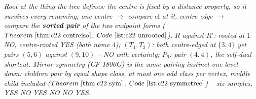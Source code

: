 \begin{recallbox}
\emph{Root at the thing the tree defines: the centre is fixed by a distance
property, so it survives every renaming; one centre \(\to\) compare
\(\mathrm{cl}\) at it, centre edge \(\to\) compare the \textbf{sorted pair} of the
two endpoint forms (\(\thmref{c22-centreiso}\), \(\coderef{c22-unrooted}\)).  \(R\)
against \(R'\): rooted-at-\(1\) NO, centre-rooted YES (both name \(4\));
\((T_1,T_2)\): both centre-edged at \(\{3,4\}\) yet pairs \((5,6)\) against
\((9,10)\) -- NO with certainty; \(P_6\): pair \((4,4)\), the self-dual shortcut.
Mirror-symmetry (CF 1800G) is the same pairing instinct one level down: children
pair by equal shape class, at most one odd class per vertex, middle child
included (\(\thmref{c22-sym}\), \(\coderef{c22-symmetree}\)) -- six samples,
YES NO YES NO NO YES.}
\end{recallbox}
